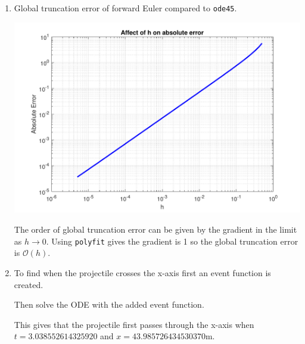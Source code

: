 \documentclass[a4paper,11pt]{article}
\newcommand{\order}{\mathcal{O}}
\begin{document}
\begin{enumerate}
	
	\item Global truncation error of forward Euler compared to \verb*|ode45|.
	\begin{center}
		\includegraphics[scale=0.7]{images/Q3d.pdf}
	\end{center}
	The order of global truncation error can be given by the gradient in the 
	limit as $h \xrightarrow{} 0$. Using \verb*|polyfit| gives the gradient 
	is 1 so the 
	global truncation error is $\order(h)$.
	
	\item To find when the projectile crosses the x-axis first an event 
	function is created.
	
	Then solve the ODE with the added event function.
	
	This gives that the projectile first passes through the x-axis when 
	$t=3.038552614325920$ and $x=43.985726434530370$m.
	

\end{enumerate}
\end{document}
